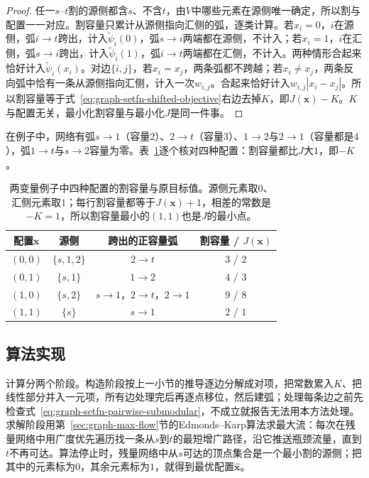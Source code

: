 \begin{proof}
任一$s$--$t$割的源侧都含$s$、不含$t$，由$V$中哪些元素在源侧唯一确定，所以割与配置一一对应。割容量只累计从源侧指向汇侧的弧，逐类计算。若$x_i=0$，$i$在源侧，弧$i\to t$跨出，计入$\tilde\psi_i(0)$，弧$s\to i$两端都在源侧，不计入；若$x_i=1$，$i$在汇侧，弧$s\to i$跨出，计入$\tilde\psi_i(1)$，弧$i\to t$两端都在汇侧，不计入。两种情形合起来恰好计入$\tilde\psi_i(x_i)$。对边$\{i,j\}$，若$x_i=x_j$，两条弧都不跨越；若$x_i\neq x_j$，两条反向弧中恰有一条从源侧指向汇侧，计入一次$w_{i,j}$。合起来恰好计入$w_{i,j}|x_i-x_j|$。所以割容量等于式~\eqref{eq:graph-setfn-shifted-objective}右边去掉$K$，即$J(\bm x)-K$。$K$与配置无关，最小化割容量与最小化$J$是同一件事。
\end{proof}

在例子中，网络有弧$s\to1$（容量$2$）、$2\to t$（容量$3$）、$1\to2$与$2\to1$（容量都是$4$），弧$1\to t$与$s\to2$容量为零。表~\ref{tab:graph-setfn-cut-check}逐个核对四种配置：割容量都比$J$大$1$，即$-K$。

\begin{table}[!htb]
  \centering
  \begin{tabular}{cccc}
    \toprule
    配置$\bm x$ & 源侧 & 跨出的正容量弧 & 割容量 / $J(\bm x)$ \\
    \midrule
    $(0,0)$ & $\{s,1,2\}$ & $2\to t$ & $3$ / $2$ \\
    $(0,1)$ & $\{s,1\}$ & $1\to2$ & $4$ / $3$ \\
    $(1,0)$ & $\{s,2\}$ & $s\to1$，$2\to t$，$2\to1$ & $9$ / $8$ \\
    $(1,1)$ & $\{s\}$ & $s\to1$ & $2$ / $1$ \\
    \bottomrule
  \end{tabular}
  \caption{两变量例子中四种配置的割容量与原目标值。源侧元素取$0$、汇侧元素取$1$；每行割容量都等于$J(\bm x)+1$，相差的常数是$-K=1$，所以割容量最小的$(1,1)$也是$J$的最小点。}
  \label{tab:graph-setfn-cut-check}
\end{table}

\subsection{算法实现}
\label{sec:graph-setfn-cut-solving}

计算分两个阶段。构造阶段按上一小节的推导逐边分解成对项，把常数累入$K$、把线性部分并入一元项，所有边处理完后再逐点移位，然后建弧；处理每条边之前先检查式~\eqref{eq:graph-setfn-pairwise-submodular}，不成立就报告无法用本方法处理。求解阶段用第~\ref{sec:graph-max-flow}节的Edmonds--Karp算法求最大流：每次在残量网络中用广度优先遍历找一条从$s$到$t$的最短增广路径，沿它推送瓶颈流量，直到$t$不再可达。算法停止时，残量网络中从$s$可达的顶点集合是一个最小割的源侧；把其中的元素标为$0$，其余元素标为$1$，就得到最优配置$\hat{\bm x}$。

